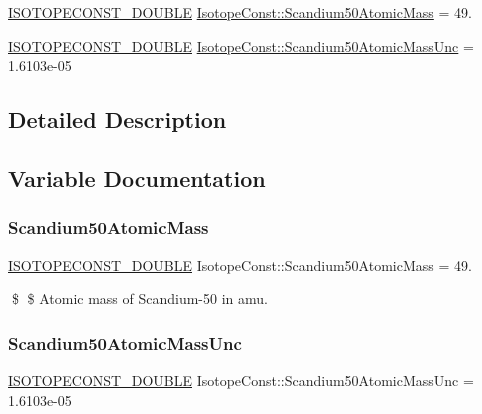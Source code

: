 \begin{DoxyCompactItemize}
\item 
\mbox{\hyperlink{group___isotope_const-_macros_ga8f45a7272ce02c0b4c65c44636ed719a}{I\+S\+O\+T\+O\+P\+E\+C\+O\+N\+S\+T\+\_\+\+D\+O\+U\+B\+LE}} \mbox{\hyperlink{group___isotope_const-_scandium-_sc50_ga3bb5a37dc73e9cee5710b24094fbaf80}{Isotope\+Const\+::\+Scandium50\+Atomic\+Mass}} = 49.
\item 
\mbox{\hyperlink{group___isotope_const-_macros_ga8f45a7272ce02c0b4c65c44636ed719a}{I\+S\+O\+T\+O\+P\+E\+C\+O\+N\+S\+T\+\_\+\+D\+O\+U\+B\+LE}} \mbox{\hyperlink{group___isotope_const-_scandium-_sc50_ga27d94b1098105e3a9c663fe3d7cc61ec}{Isotope\+Const\+::\+Scandium50\+Atomic\+Mass\+Unc}} = 1.\+6103e-\/05
\end{DoxyCompactItemize}


\subsection{Detailed Description}


\subsection{Variable Documentation}
\mbox{\label{group___isotope_const-_scandium-_sc50_ga3bb5a37dc73e9cee5710b24094fbaf80}} 
\subsubsection{\texorpdfstring{Scandium50\+Atomic\+Mass}{Scandium50AtomicMass}}
{\footnotesize\ttfamily \mbox{\hyperlink{group___isotope_const-_macros_ga8f45a7272ce02c0b4c65c44636ed719a}{I\+S\+O\+T\+O\+P\+E\+C\+O\+N\+S\+T\+\_\+\+D\+O\+U\+B\+LE}} Isotope\+Const\+::\+Scandium50\+Atomic\+Mass = 49.}

\$ \$ Atomic mass of Scandium-\/50 in amu. \mbox{\label{group___isotope_const-_scandium-_sc50_ga27d94b1098105e3a9c663fe3d7cc61ec}} 
\subsubsection{\texorpdfstring{Scandium50\+Atomic\+Mass\+Unc}{Scandium50AtomicMassUnc}}
{\footnotesize\ttfamily \mbox{\hyperlink{group___isotope_const-_macros_ga8f45a7272ce02c0b4c65c44636ed719a}{I\+S\+O\+T\+O\+P\+E\+C\+O\+N\+S\+T\+\_\+\+D\+O\+U\+B\+LE}} Isotope\+Const\+::\+Scandium50\+Atomic\+Mass\+Unc = 1.\+6103e-\/05}

